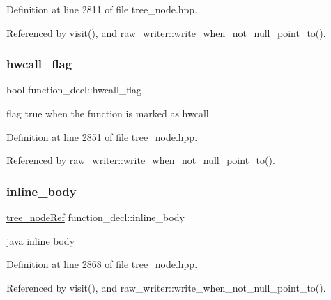 Definition at line 2811 of file tree\+\_\+node.\+hpp.



Referenced by visit(), and raw\+\_\+writer\+::write\+\_\+when\+\_\+not\+\_\+null\+\_\+point\+\_\+to().

\mbox{\label{structfunction__decl_abfbad4d32959028d666eed9189ae5411}} 
\subsubsection{\texorpdfstring{hwcall\+\_\+flag}{hwcall\_flag}}
{\footnotesize\ttfamily bool function\+\_\+decl\+::hwcall\+\_\+flag}



flag true when the function is marked as hwcall 



Definition at line 2851 of file tree\+\_\+node.\+hpp.



Referenced by raw\+\_\+writer\+::write\+\_\+when\+\_\+not\+\_\+null\+\_\+point\+\_\+to().

\mbox{\label{structfunction__decl_afa04f25b4d2937afad322b62f74d6ca5}} 
\subsubsection{\texorpdfstring{inline\+\_\+body}{inline\_body}}
{\footnotesize\ttfamily \hyperlink{tree__node_8hpp_a6ee377554d1c4871ad66a337eaa67fd5}{tree\+\_\+node\+Ref} function\+\_\+decl\+::inline\+\_\+body}



java inline body 



Definition at line 2868 of file tree\+\_\+node.\+hpp.



Referenced by visit(), and raw\+\_\+writer\+::write\+\_\+when\+\_\+not\+\_\+null\+\_\+point\+\_\+to().

\mbox{\label{structfunction__decl_ac3aaffaf5fea1c05d4c4896315eae082}} 
